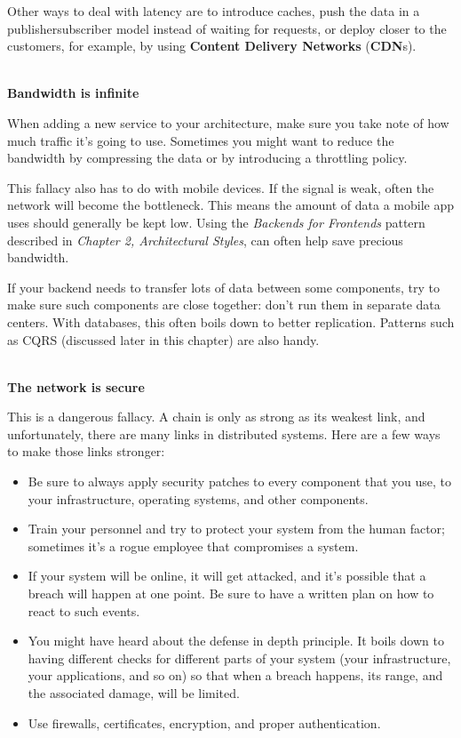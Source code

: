 Other ways to deal with latency are to introduce caches, push the data in a publishersubscriber model instead of waiting for requests, or deploy closer to the customers, for example, by using \textbf{Content Delivery Networks} (\textbf{CDN}s).


\hspace*{\fill} \\ %
\noindent
\textbf{Bandwidth is infinite}

When adding a new service to your architecture, make sure you take note of how much traffic it's going to use. Sometimes you might want to reduce the bandwidth by compressing the data or by introducing a throttling policy.

This fallacy also has to do with mobile devices. If the signal is weak, often the network will become the bottleneck. This means the amount of data a mobile app uses should generally be kept low. Using the \textit{Backends for Frontends} pattern described in \textit{Chapter 2, Architectural Styles}, can often help save precious bandwidth.

If your backend needs to transfer lots of data between some components, try to make sure such components are close together: don't run them in separate data centers. With databases, this often boils down to better replication. Patterns such as CQRS (discussed later in this chapter) are also handy.

\hspace*{\fill} \\ %
\noindent
\textbf{The network is secure}

This is a dangerous fallacy. A chain is only as strong as its weakest link, and unfortunately, there are many links in distributed systems. Here are a few ways to make those links stronger:


\begin{itemize}
\item 
Be sure to always apply security patches to every component that you use, to your infrastructure, operating systems, and other components.

\item 
Train your personnel and try to protect your system from the human factor; sometimes it's a rogue employee that compromises a system.

\item 
If your system will be online, it will get attacked, and it's possible that a breach will happen at one point. Be sure to have a written plan on how to react to such events.

\item 
You might have heard about the defense in depth principle. It boils down to having different checks for different parts of your system (your infrastructure, your applications, and so on) so that when a breach happens, its range, and the associated damage, will be limited.

\item 
Use firewalls, certificates, encryption, and proper authentication.
\end{itemize}

